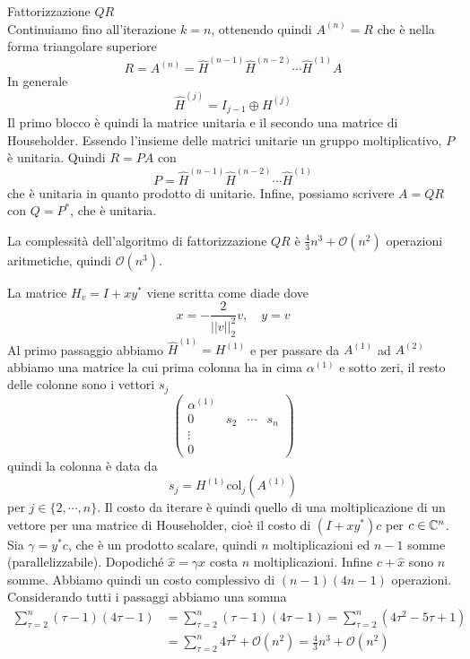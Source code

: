 \documentclass[a4paper]{article}
\begin{document}
\begin{snippetproof}{Fattorizzazione \(QR\)}
\[    \]
    Continuiamo fino all'iterazione \(k=n\), ottenendo quindi
    \(A^{(n)} = R\) che è nella forma triangolare superiore
    \[
        R=A^{(n)} = \hat H^{(n-1)}
        \hat H^{(n-2)} \cdots
        \hat H^{(1)} A
    \]
    In generale
    \[
        \hat H^{(j)} = I_{j-1} \oplus H^{(j)}
    \]
    Il primo blocco è quindi la matrice unitaria e il secondo una matrice di Householder.
    Essendo l'insieme delle matrici unitarie un gruppo moltiplicativo, \(P\) è unitaria.
    Quindi \(R = PA\) con \[
        P = \hat H^{(n-1)}
        \hat H^{(n-2)} \cdots
        \hat H^{(1)}
    \]
    che è unitaria in quanto prodotto di unitarie.
    Infine, possiamo scrivere \(A=QR\) con \(Q = P^*\), che è unitaria.
\end{snippetproof}

\pagebreak

\begin{snippetproposition}{}
    La complessità
    dell'algoritmo di fattorizzazione \(QR\) è \(\frac43n^3+\mathcal O(n^2)\) operazioni aritmetiche, quindi \(\mathcal O(n^3)\).
\end{snippetproposition}

\begin{snippetproof}{}
    La matrice \(H_v = I + xy^*\) viene scritta come diade
    dove \[
        x = -\frac{2}{||v||_2^2} v, \quad y = v
    \]
    Al primo passaggio abbiamo \(\hat H^{(1)} = H^{(1)}\)
    e per passare da \(A^{(1)}\) ad \(A^{(2)}\)
    abbiamo una matrice la cui prima colonna ha in cima \(\alpha^{(1)}\)
    e sotto zeri, il resto delle colonne sono i vettori \(s_j\)
    \[
        \left(
            \begin{array}{c|c|c|c}
                \alpha^{(1)} & & & \\
                0 & s_2 & \cdots & s_n \\
                \vdots & & & \\
                0 & & &
            \end{array}
        \right)
    \]
    quindi la colonna è data da
    \[
        s_j = H^{(1)} \text{col}_j(A^{(1)})
    \]
    per \(j \in \{2, \cdots, n\}\).
    Il costo da iterare è quindi quello di una moltiplicazione di un vettore
    per una matrice di Householder, cioè il costo di \((I + xy^*) c\)
    per \(c \in \mathbb{C}^n\).
    Sia \(\gamma = y^* c\), che è un prodotto scalare, quindi \(n\)
    moltiplicazioni ed \(n-1\) somme (parallelizzabile).
    Dopodiché \(\hat x = \gamma x\)
    costa \(n\) moltiplicazioni. Infine
    \(c + \hat x\) sono \(n\) somme.
    Abbiamo quindi un costo complessivo di \((n-1)(4n-1)\) operazioni.
    Considerando tutti i passaggi abbiamo una somma
    \begin{align*}
        \sum_{\tau = 2}^n (\tau-1)(4\tau-1)
        &= \sum_{\tau = 2}^n (\tau-1)(4\tau-1) = \sum_{\tau = 2}^n
        \left(4\tau^2 - 5\tau + 1\right) \\
        &= \sum_{\tau = 2}^n 4\tau^2 + \mathcal O(n^2) = \frac{4}{3}n^3 + \mathcal O(n^2)
    \end{align*}
\end{snippetproof}
\end{document}
